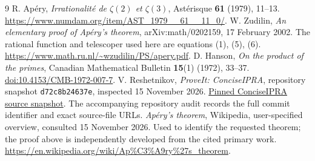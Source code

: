 \documentclass[11pt]{article}
\theoremstyle{definition}\newtheorem{definition}[theorem]{Definition}
\theoremstyle{remark}\newtheorem{remark}[theorem]{Remark}
\begin{document}
\begin{thebibliography}{9}
R. Ap\'ery, \emph{Irrationalit\'e de $\zeta(2)$ et $\zeta(3)$},
Ast\'erisque \textbf{61} (1979), 11--13.
\url{https://www.numdam.org/item/AST_1979__61__11_0/}.
W. Zudilin, \emph{An elementary proof of Ap\'ery's theorem},
arXiv:math/0202159, 17 February 2002.
The rational function and telescoper used here are equations (1), (5), (6).
\url{https://www.math.ru.nl/~wzudilin/PS/apery.pdf}.
D. Hanson, \emph{On the product of the primes}, Canadian Mathematical
Bulletin \textbf{15}(1) (1972), 33--37.
\href{https://doi.org/10.4153/CMB-1972-007-7}{doi:10.4153/CMB-1972-007-7}.
V. Reshetnikov, \emph{ProveIt: ConciseIPRA}, repository snapshot
\texttt{d72c8b24637e}, inspected 15 November 2026.
\href{https://github.com/VladimirReshetnikov/ProveIt/tree/d72c8b24637e342816dc92d11bef337748683e51/Logic/PrimitiveRecursiveArithmetic/ConciseIPRA}{Pinned ConciseIPRA source snapshot}. The accompanying repository audit records
the full commit identifier and exact source-file URLs.
\emph{Ap\'ery's theorem}, Wikipedia, user-specified overview,
consulted 15 November 2026. Used to identify the requested theorem;
the proof above is independently developed from the cited primary work.
\url{https://en.wikipedia.org/wiki/Ap%C3%A9ry%27s_theorem}.
\end{thebibliography}
\end{document}
